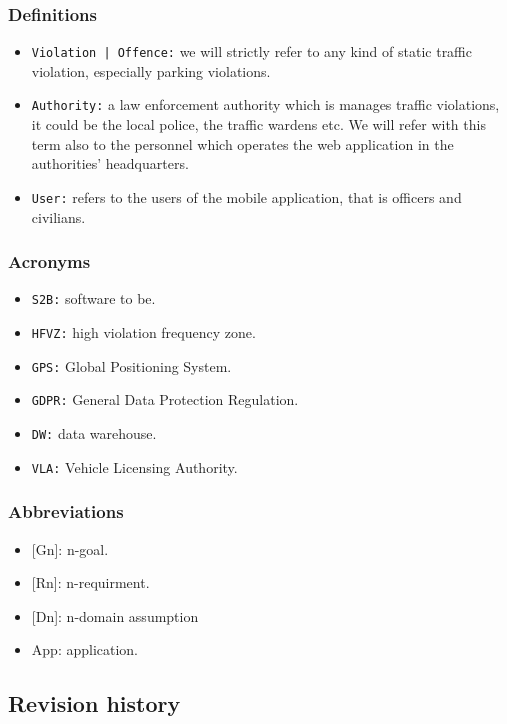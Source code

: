 \documentclass[12pt,a4paper]{article}
\begin{document}
\subsubsection{Definitions}
 \begin{itemize}
\item \texttt{Violation | Offence:} we will strictly refer to any kind of static traffic violation, especially parking violations. 
\item \texttt{Authority:} a law enforcement authority which is manages traffic violations, it could be the local police, the traffic wardens etc. We will refer with this term also to the personnel which operates the web application in the authorities' headquarters.
\item \texttt{User:} refers to the users of the mobile application, that is officers and civilians.
\end{itemize}
\subsubsection{Acronyms}
\begin{itemize}
\item \texttt{S2B:} software to be.
\item \texttt{HFVZ:} high violation frequency zone.
\item \texttt{GPS:} Global Positioning System.
\item \texttt{GDPR:} General Data Protection Regulation.
\item \texttt{DW:} data warehouse.
\item \texttt{VLA:} Vehicle Licensing Authority.
\end{itemize}
\subsubsection{Abbreviations}
\begin{itemize}
				\item {[Gn]}: n-goal.
				\item {[Rn]}: n-requirment.
				\item {[Dn]}: n-domain assumption
				\item {App}: application.
			\end{itemize}
\subsection{Revision history} 
\end{document}
